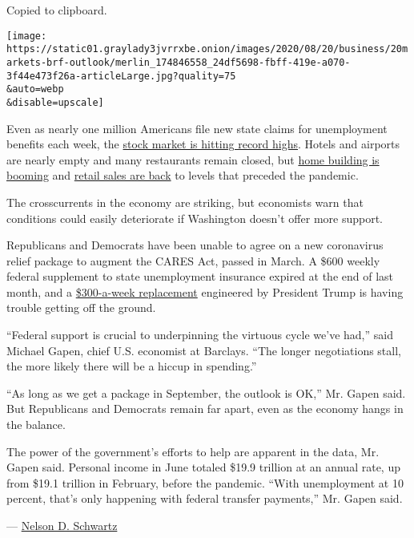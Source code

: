Copied to clipboard.

\texttt{[image: https://static01.graylady3jvrrxbe.onion/images/2020/08/20/business/20markets-brf-outlook/merlin\_174846558\_24df5698-fbff-419e-a070-3f44e473f26a-articleLarge.jpg?quality=75\\\&auto=webp\\\&disable=upscale]}

Even as nearly one million Americans file new state claims for
unemployment benefits each week, the
\href{https://www.nytimes3xbfgragh.onion/2020/08/18/business/stock-market-record.html}{stock
market is hitting record highs}. Hotels and airports are nearly empty
and many restaurants remain closed, but
\href{https://www.reuters.com/article/us-usa-economy-housingstarts/us-housing-starts-surge-in-july-in-rare-pandemic-bright-spot-idUSKCN25E21O}{home
building is booming} and
\href{https://www.nytimes3xbfgragh.onion/2020/08/14/business/retail-sales-coronavirus.html}{retail
sales are back} to levels that preceded the pandemic.

The crosscurrents in the economy are striking, but economists warn that
conditions could easily deteriorate if Washington doesn't offer more
support.

Republicans and Democrats have been unable to agree on a new coronavirus
relief package to augment the CARES Act, passed in March. A \$600 weekly
federal supplement to state unemployment insurance expired at the end of
last month, and a
\href{https://www.nytimes3xbfgragh.onion/2020/08/13/business/economy/unemployment-benefits-coronavirus.html}{\$300-a-week
replacement} engineered by President Trump is having trouble getting off
the ground.

``Federal support is crucial to underpinning the virtuous cycle we've
had,'' said Michael Gapen, chief U.S. economist at Barclays. ``The
longer negotiations stall, the more likely there will be a hiccup in
spending.''

``As long as we get a package in September, the outlook is OK,'' Mr.
Gapen said. But Republicans and Democrats remain far apart, even as the
economy hangs in the balance.

The power of the government's efforts to help are apparent in the data,
Mr. Gapen said. Personal income in June totaled \$19.9 trillion at an
annual rate, up from \$19.1 trillion in February, before the pandemic.
``With unemployment at 10 percent, that's only happening with federal
transfer payments,'' Mr. Gapen said.

---
\href{https://www.nytimes3xbfgragh.onion/by/nelson-d-schwartz}{Nelson D.
Schwartz}

